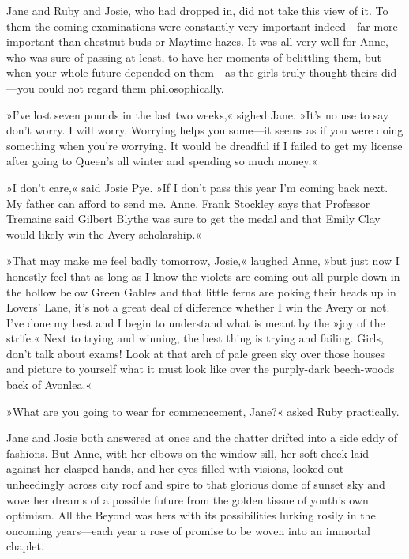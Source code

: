 Jane and Ruby and Josie, who had dropped in, did not take this view of it. To them the coming examinations were constantly very important indeed—far more important than chestnut buds or Maytime hazes. It was all very well for Anne, who was sure of passing at least, to have her moments of belittling them, but when your whole future depended on them—as the girls truly thought theirs did—you could not regard them philosophically.

»I’ve lost seven pounds in the last two weeks,« sighed Jane. »It’s no use to say don’t worry. I will worry. Worrying helps you some—it seems as if you were doing something when you’re worrying. It would be dreadful if I failed to get my license after going to Queen’s all winter and spending so much money.«

»I don’t care,« said Josie Pye. »If I don’t pass this year I’m coming back next. My father can afford to send me. Anne, Frank Stockley says that Professor Tremaine said Gilbert Blythe was sure to get the medal and that Emily Clay would likely win the Avery scholarship.«

»That may make me feel badly tomorrow, Josie,« laughed Anne, »but just now I honestly feel that as long as I know the violets are coming out all purple down in the hollow below Green Gables and that little ferns are poking their heads up in Lovers’ Lane, it’s not a great deal of difference whether I win the Avery or not. I’ve done my best and I begin to understand what is meant by the »joy of the strife.« Next to trying and winning, the best thing is trying and failing. Girls, don’t talk about exams! Look at that arch of pale green sky over those houses and picture to yourself what it must look like over the purply-dark beech-woods back of Avonlea.«

»What are you going to wear for commencement, Jane?« asked Ruby practically.

Jane and Josie both answered at once and the chatter drifted into a side eddy of fashions. But Anne, with her elbows on the window sill, her soft cheek laid against her clasped hands, and her eyes filled with visions, looked out unheedingly across city roof and spire to that glorious dome of sunset sky and wove her dreams of a possible future from the golden tissue of youth’s own optimism. All the Beyond was hers with its possibilities lurking rosily in the oncoming years—each year a rose of promise to be woven into an immortal chaplet.